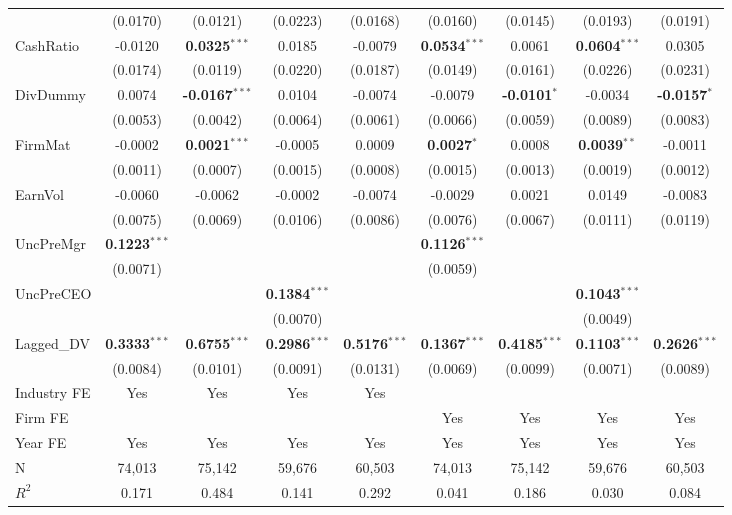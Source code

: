 \documentclass[11pt,a4paper]{article}
\begin{document}
\begin{table}[htbp]
\begin{tabular}{lcccccccc}
 & (0.0170) & (0.0121) & (0.0223) & (0.0168) & (0.0160) & (0.0145) & (0.0193) & (0.0191) \\
CashRatio & -0.0120 & \textbf{0.0325}$^{***}$ & 0.0185 & -0.0079 & \textbf{0.0534}$^{***}$ & 0.0061 & \textbf{0.0604}$^{***}$ & 0.0305 \\
 & (0.0174) & (0.0119) & (0.0220) & (0.0187) & (0.0149) & (0.0161) & (0.0226) & (0.0231) \\
DivDummy & 0.0074 & \textbf{-0.0167}$^{***}$ & 0.0104 & -0.0074 & -0.0079 & \textbf{-0.0101}$^{*}$ & -0.0034 & \textbf{-0.0157}$^{*}$ \\
 & (0.0053) & (0.0042) & (0.0064) & (0.0061) & (0.0066) & (0.0059) & (0.0089) & (0.0083) \\
FirmMat & -0.0002 & \textbf{0.0021}$^{***}$ & -0.0005 & 0.0009 & \textbf{0.0027}$^{*}$ & 0.0008 & \textbf{0.0039}$^{**}$ & -0.0011 \\
 & (0.0011) & (0.0007) & (0.0015) & (0.0008) & (0.0015) & (0.0013) & (0.0019) & (0.0012) \\
EarnVol & -0.0060 & -0.0062 & -0.0002 & -0.0074 & -0.0029 & 0.0021 & 0.0149 & -0.0083 \\
 & (0.0075) & (0.0069) & (0.0106) & (0.0086) & (0.0076) & (0.0067) & (0.0111) & (0.0119) \\
UncPreMgr & \textbf{0.1223}$^{***}$ &  &  &  & \textbf{0.1126}$^{***}$ &  &  &  \\
 & (0.0071) &  &  &  & (0.0059) &  &  &  \\
UncPreCEO &  &  & \textbf{0.1384}$^{***}$ &  &  &  & \textbf{0.1043}$^{***}$ &  \\
 &  &  & (0.0070) &  &  &  & (0.0049) &  \\
Lagged\_DV & \textbf{0.3333}$^{***}$ & \textbf{0.6755}$^{***}$ & \textbf{0.2986}$^{***}$ & \textbf{0.5176}$^{***}$ & \textbf{0.1367}$^{***}$ & \textbf{0.4185}$^{***}$ & \textbf{0.1103}$^{***}$ & \textbf{0.2626}$^{***}$ \\
 & (0.0084) & (0.0101) & (0.0091) & (0.0131) & (0.0069) & (0.0099) & (0.0071) & (0.0089) \\
\midrule
Industry FE & Yes & Yes & Yes & Yes &  &  &  &  \\
Firm FE &  &  &  &  & Yes & Yes & Yes & Yes \\
Year FE & Yes & Yes & Yes & Yes & Yes & Yes & Yes & Yes \\
\midrule
N & 74,013 & 75,142 & 59,676 & 60,503 & 74,013 & 75,142 & 59,676 & 60,503 \\
$R^2$ & 0.171 & 0.484 & 0.141 & 0.292 & 0.041 & 0.186 & 0.030 & 0.084 \\

\end{tabular}
\end{table}
\end{document}
